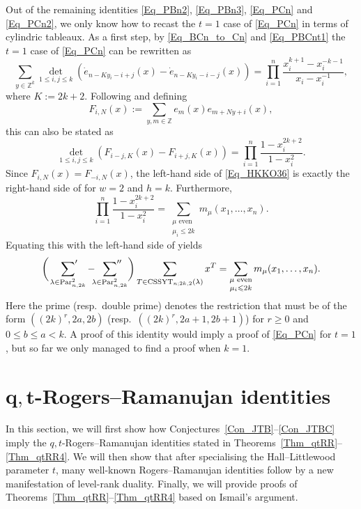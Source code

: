 \documentclass[pdftex]{sigma}
\numberwithin{equation}{section}
\renewcommand{\leq}{\leqslant}
\renewcommand{\geq}{\geqslant}
\DeclareMathOperator{\Par}{Par}
\DeclareMathOperator{\CSSYT}{CSSYT}
\newcommand{\la}{\lambda}
\begin{document}
Out of the remaining identities \eqref{Eq_PBn2}, \eqref{Eq_PBn3},
\eqref{Eq_PCn} and \eqref{Eq_PCn2}, we only know how to recast the
$t=1$ case of \eqref{Eq_PCn} in terms of cylindric tableaux.
As a first step, by \eqref{Eq_BCn_to_Cn} and \eqref{Eq_PBCnt1}
the~${t=1}$ case of \eqref{Eq_PCn} can be rewritten as
\[
\sum_{y\in\mathbb{Z}^k}
\det_{1\leq i,j\leq k} (
\dot{e}_{n-Ky_i-i+j}(x)
-\dot{e}_{n-Ky_i-i-j}(x) )
=\prod_{i=1}^n \frac{x_i^{k+1}-x_i^{-k-1}}{x_i-x_i^{-1}},
\]
where $K:=2k+2$.
Following \cite{HKKO25} and defining
\begin{equation}\label{Eq_FiN}
F_{i,N}(x):=\sum_{y,m\in\mathbb{Z}} e_m(x)e_{m+Ny+i}(x),
\end{equation}
this can also be stated as
\begin{equation}\label{Eq_HKKO36}
\det_{1\leq i,j\leq k} ( F_{i-j,K}(x)-F_{i+j,K}(x) )
=\prod_{i=1}^n \frac{1-x_i^{2k+2}}{1-x_i^2}.
\end{equation}
Since $F_{i,N}(x)=F_{-i,N}(x)$, the left-hand side of
\eqref{Eq_HKKO36} is exactly the right-hand side of
\cite[equation~(3.6)]{HKKO25} for $w=2$ and $h=k$.
Furthermore,
\[
\prod_{i=1}^n \frac{1-x_i^{2k+2}}{1-x_i^2}=
\sum_{\substack{\mu \text{ even}\\[1pt] \mu_i\leq 2k}}
m_{\mu}(x_1,\dots,x_n).
\]
Equating this with the left-hand side of
\cite[equation~(3.6)]{HKKO25} yields
\[
\biggl(\:\sideset{}{'}\sum_{\la\in\Par_{n,2k}^2}
-\sideset{}{''}\sum_{\la\in\Par_{n,2k}^2}\biggr)
\sum_{T\in\CSSYT_{n;2k,2}(\la)} x^T
=\sum_{\substack{\mu \text{ even}\\[1pt] \mu_i\leq 2k}}
m_{\mu}(x_1,\dots,x_n).
\]
Here the prime (resp.\ double prime) denotes the restriction that
\smash{$\la\in\Par_{n,2k}^2$} must be of the form $((2k)^r,2a,2b)$
(resp.\ $((2k)^r,2a+1,2b+1)$) for $r\geq 0$ and
$0\leq b\leq a<k$.
A proof of this identity would imply a proof of \eqref{Eq_PCn} for $t=1$,
but so far we only managed to find a proof when $k=1$.

\section[q,t-Rogers--Ramanujan identities]{$\boldsymbol{q,t}$-Rogers--Ramanujan identities}\label{Sec_qtRR}

In this section, we will first show how
Conjectures~\ref{Con_JTB}--\ref{Con_JTBC} imply the
$q,t$-Rogers--Ramanujan identities stated in
Theorems~\ref{Thm_qtRR}--\ref{Thm_qtRR4}.
We will then show that after specialising the Hall--Littlewood parameter
$t$, many well-known Rogers--Ramanujan identities follow by a new
manifestation of level-rank duality.
Finally, we will provide proofs of
Theorems~\ref{Thm_qtRR}--\ref{Thm_qtRR4} based on Ismail's argument.
\end{document}
